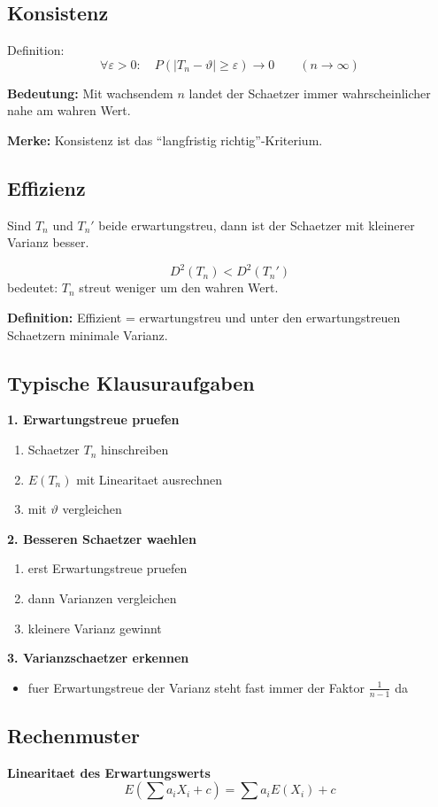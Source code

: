 \documentclass[a4paper,11pt]{article}
\begin{document}
\subsection{Konsistenz}
Definition:
\[
\forall \varepsilon>0:\quad P(|T_n-\vartheta|\ge \varepsilon)\to 0 \qquad (n\to\infty)
\]

\textbf{Bedeutung:}
Mit wachsendem $n$ landet der Schaetzer immer wahrscheinlicher nahe am wahren Wert.

\textbf{Merke:}
Konsistenz ist das ``langfristig richtig''-Kriterium.

\subsection{Effizienz}
Sind $T_n$ und $T_n'$ beide erwartungstreu, dann ist der Schaetzer mit kleinerer Varianz besser.

\[
D^2(T_n)<D^2(T_n')
\]
bedeutet:
$T_n$ streut weniger um den wahren Wert.

\textbf{Definition:}
Effizient = erwartungstreu und unter den erwartungstreuen Schaetzern minimale Varianz.

\subsection{Typische Klausuraufgaben}
\textbf{1. Erwartungstreue pruefen}
\begin{enumerate}
  \item Schaetzer $T_n$ hinschreiben
  \item $E(T_n)$ mit Linearitaet ausrechnen
  \item mit $\vartheta$ vergleichen
\end{enumerate}

\textbf{2. Besseren Schaetzer waehlen}
\begin{enumerate}
  \item erst Erwartungstreue pruefen
  \item dann Varianzen vergleichen
  \item kleinere Varianz gewinnt
\end{enumerate}

\textbf{3. Varianzschaetzer erkennen}
\begin{itemize}
  \item fuer Erwartungstreue der Varianz steht fast immer der Faktor $\frac{1}{n-1}$ da
\end{itemize}

\subsection{Rechenmuster}
\textbf{Linearitaet des Erwartungswerts}
\[
E\left(\sum a_iX_i+c\right)=\sum a_iE(X_i)+c
\]
\end{document}
